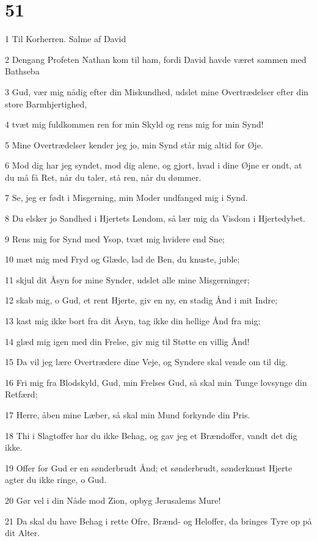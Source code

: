 \chapter{51}

\par 1 Til Korherren. Salme af David
\par 2 Dengang Profeten Nathan kom til ham, fordi David havde været sammen med Bathseba
\par 3 Gud, vær mig nådig efter din Miskundhed, udslet mine Overtrædelser efter din store Barmhjertighed,
\par 4 tvæt mig fuldkommen ren for min Skyld og rens mig for min Synd!
\par 5 Mine Overtrædelser kender jeg jo, min Synd står mig altid for Øje.
\par 6 Mod dig har jeg syndet, mod dig alene, og gjort, hvad i dine Øjne er ondt, at du må få Ret, når du taler, stå ren, når du dømmer.
\par 7 Se, jeg er født i Misgerning, min Moder undfanged mig i Synd.
\par 8 Du elsker jo Sandhed i Hjertets Løndom, så lær mig da Visdom i Hjertedybet.
\par 9 Rens mig for Synd med Ysop, tvæt mig hvidere end Sne;
\par 10 mæt mig med Fryd og Glæde, lad de Ben, du knuste, juble;
\par 11 skjul dit Åsyn for mine Synder, udslet alle mine Misgerninger;
\par 12 skab mig, o Gud, et rent Hjerte, giv en ny, en stadig Ånd i mit Indre;
\par 13 kast mig ikke bort fra dit Åsyn, tag ikke din hellige Ånd fra mig;
\par 14 glæd mig igen med din Frelse, giv mig til Støtte en villig Ånd!
\par 15 Da vil jeg lære Overtrædere dine Veje, og Syndere skal vende om til dig.
\par 16 Fri mig fra Blodskyld, Gud, min Frelses Gud, så skal min Tunge lovsynge din Retfærd;
\par 17 Herre, åben mine Læber, så skal min Mund forkynde din Pris.
\par 18 Thi i Slagtoffer har du ikke Behag, og gav jeg et Brændoffer, vandt det dig ikke.
\par 19 Offer for Gud er en sønderbrudt Ånd; et sønderbrudt, sønderknust Hjerte agter du ikke ringe, o Gud.
\par 20 Gør vel i din Nåde mod Zion, opbyg Jerusalems Mure!
\par 21 Da skal du have Behag i rette Ofre, Brænd- og Heloffer, da bringes Tyre op på dit Alter.

